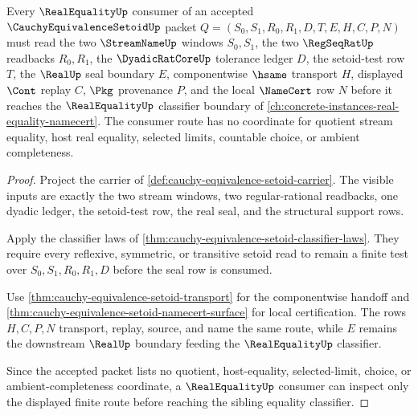 \begin{theorem}
\label{thm:cauchy-equivalence-setoid-real-equality-consumer-route}
Every $\RealEqualityUp$ consumer of an accepted $\CauchyEquivalenceSetoidUp$ packet $Q=(S_0,S_1,R_0,R_1,D,T,E,H,C,P,N)$ must read the two $\StreamNameUp$ windows $S_0,S_1$, the two $\RegSeqRatUp$ readbacks $R_0,R_1$, the $\DyadicRatCoreUp$ tolerance ledger $D$, the setoid-test row $T$, the $\RealUp$ seal boundary $E$, componentwise $\hsame$ transport $H$, displayed $\Cont$ replay $C$, $\Pkg$ provenance $P$, and the local $\NameCert$ row $N$ before it reaches the $\RealEqualityUp$ classifier boundary of \autoref{ch:concrete-instances-real-equality-namecert}. The consumer route has no coordinate for quotient stream equality, host real equality, selected limits, countable choice, or ambient completeness.
\end{theorem}
\begin{proof}
Project the carrier of \autoref{def:cauchy-equivalence-setoid-carrier}. The visible inputs are exactly the two stream windows, two regular-rational readbacks, one dyadic ledger, the setoid-test row, the real seal, and the structural support rows.

Apply the classifier laws of \autoref{thm:cauchy-equivalence-setoid-classifier-laws}. They require every reflexive, symmetric, or transitive setoid read to remain a finite test over $S_0,S_1,R_0,R_1,D$ before the seal row is consumed.

Use \autoref{thm:cauchy-equivalence-setoid-transport} for the componentwise handoff and \autoref{thm:cauchy-equivalence-setoid-namecert-surface} for local certification. The rows $H,C,P,N$ transport, replay, source, and name the same route, while $E$ remains the downstream $\RealUp$ boundary feeding the $\RealEqualityUp$ classifier.

Since the accepted packet lists no quotient, host-equality, selected-limit, choice, or ambient-completeness coordinate, a $\RealEqualityUp$ consumer can inspect only the displayed finite route before reaching the sibling equality classifier.
\end{proof}

